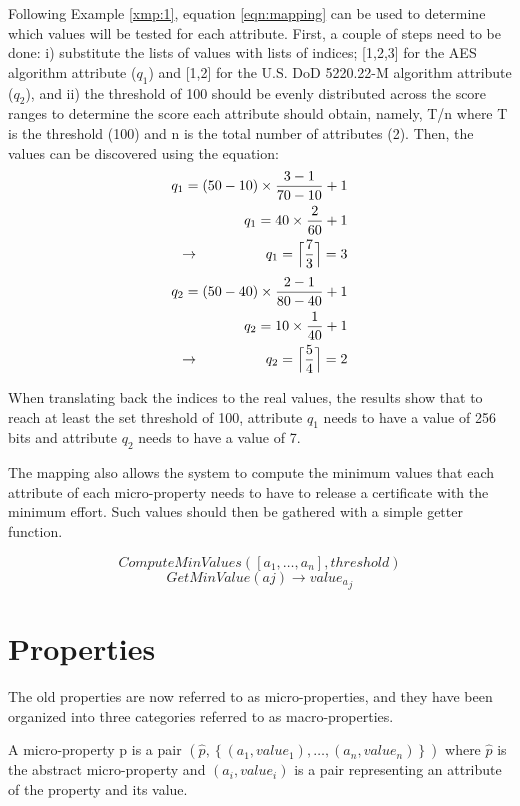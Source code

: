 \begin{example}
Following Example \ref{xmp:1}, equation \ref{eqn:mapping} can be used to determine which values will be tested for each attribute. First, a couple of steps need to be done: i) substitute the lists of values with lists of indices; [1,2,3] for the AES algorithm attribute (\(q_1\)) and [1,2] for the U.S. DoD 5220.22-M algorithm attribute (\(q_2\)), and ii) the threshold of 100 should be evenly distributed across the score ranges to determine the score each attribute should obtain, namely, T/n where T is the threshold (100) and n is the total number of attributes (2). Then, the values can be discovered using the equation:
\begin{align*}
  q_1 = (50 - 10) \times \frac{3 - 1}{70 - 10} + 1\\
  q_1 = 40 \times \frac{2}{60} + 1 \\
  \llap{$\rightarrow$\hspace{50pt}} q_1 = \Bigl\lceil\frac{7}{3}\Bigr\rceil = 3
\end{align*}
\begin{align*}
  q_2 = (50 - 40) \times \frac{2 - 1}{80 - 40} + 1\\
  q_2 = 10 \times \frac{1}{40} + 1 \\
  \llap{$\rightarrow$\hspace{50pt}} q_2 = \Bigl\lceil\frac{5}{4}\Bigr\rceil = 2
\end{align*}

When translating back the indices to the real values, the results show that to reach at least the set threshold of 100, attribute \(q_1\) needs to have a value of 256 bits and attribute \(q_2\) needs to have a value of 7.
\end{example}

The mapping also allows the system to compute the minimum values that each attribute of each micro-property needs to have to release a certificate with the minimum effort. Such values should then be gathered with a simple getter function.

\[ComputeMinValues([a_1, \dots , a_n], threshold)\]
\[GetMinValue(aj) \rightarrow {value_a}_j\]

\section{Properties}
The old properties are now referred to as micro-properties, and they have been organized into three categories referred to as macro-properties.
\begin{defn}
A micro-property p is a pair \(\left (\hat{p}, \left \{  (a_1, value_1), \dots , (a_n, value_n)\right \} \right )\) 
where \(\hat{p}\) is the abstract micro-property and \(\left ( a_i ,value_i \right )\) is a pair representing an attribute of the property and its value.
\end{defn}

